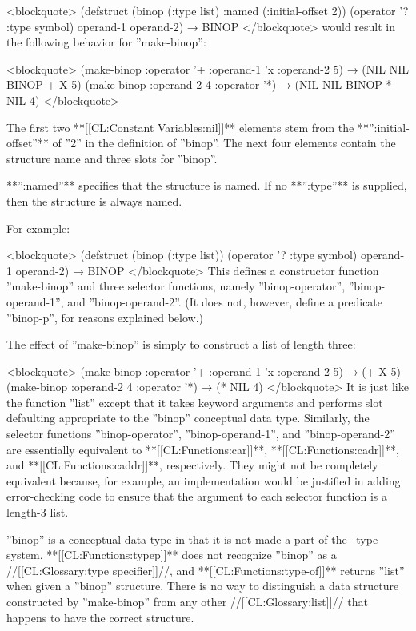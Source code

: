 <blockquote> (defstruct (binop (:type list) :named (:initial-offset 2)) (operator '? :type symbol) operand-1 operand-2) → BINOP </blockquote> would result in the following behavior for ''make-binop'':

<blockquote> (make-binop :operator '+ :operand-1 'x :operand-2 5) → (NIL NIL BINOP + X 5) (make-binop :operand-2 4 :operator '*) → (NIL NIL BINOP * NIL 4) </blockquote>

The first two **[[CL:Constant Variables:nil]]** elements stem from the **'':initial-offset''** of ''2'' in the definition of ''binop''. The next four elements contain the structure name and three slots for ''binop''.


**'':named''** specifies that the structure is named. If no **'':type''** is supplied, then the structure is always named.

For example:

<blockquote> (defstruct (binop (:type list)) (operator '? :type symbol) operand-1 operand-2) → BINOP </blockquote> This defines a constructor function ''make-binop'' and three selector functions, namely ''binop-operator'', ''binop-operand-1'', and ''binop-operand-2''. (It does not, however, define a predicate ''binop-p'', for reasons explained below.)

The effect of ''make-binop'' is simply to construct a list of length three:

<blockquote> (make-binop :operator '+ :operand-1 'x :operand-2 5) → (+ X 5) (make-binop :operand-2 4 :operator '*) → (* NIL 4) </blockquote> It is just like the function ''list'' except that it takes keyword arguments and performs slot defaulting appropriate to the ''binop'' conceptual data type. Similarly, the selector functions ''binop-operator'', ''binop-operand-1'', and ''binop-operand-2'' are essentially equivalent to **[[CL:Functions:car]]**, **[[CL:Functions:cadr]]**, and **[[CL:Functions:caddr]]**, respectively. They might not be completely equivalent because, for example, an implementation would be justified in adding error-checking code to ensure that the argument to each selector function is a length-3 list.

''binop'' is a conceptual data type in that it is not made a part of the \clisp\ type system. **[[CL:Functions:typep]]** does not recognize ''binop'' as a //[[CL:Glossary:type specifier]]//, and **[[CL:Functions:type-of]]** returns ''list'' when given a ''binop'' structure. There is no way to distinguish a data structure constructed by ''make-binop'' from any other //[[CL:Glossary:list]]// that happens to have the correct structure.


